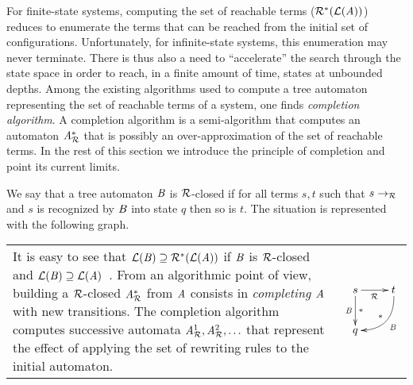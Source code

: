 


\noindent
For finite-state systems, computing the set of reachable terms
($\mathcal R^*(\mathcal{L}(\mathit A))$) reduces to enumerate the terms that can be
reached from the initial set of configurations. Unfortunately, for
infinite-state systems, this enumeration may never terminate.  There
is thus also a need to ``accelerate'' the search through the state
space in order to reach, in a finite amount of time, states at
unbounded depths. Among the existing algorithms used to compute a tree
automaton representing the set of reachable terms of a system, one
finds {\em completion algorithm}. A completion algorithm is a
semi-algorithm that computes an automaton ${\it A}_{\mathcal R}^*$ that is possibly
an over-approximation of the set of reachable terms. In the rest of
this section we introduce the principle of completion and point its
current limits.

We say that a tree automaton $\mathit B$ is $\mathcal R$-closed if for all terms
$s,t$ such that $s\rightarrow_\mathcal R$ and $s$ is recognized by $\mathit B$ into state $q$ then so is
$t$. The situation is represented with the following graph.
\begin{tabular}{lc}
  \hspace{-.3cm}
  \begin{minipage}{.8\linewidth}
    It is easy to see that $\mathcal{L}(\mathit B) \supseteq \mathcal R^*(\mathcal{L}(\mathit A))$ if
    $\mathit B$ is $\mathcal R$-closed and $\mathcal{L}(\mathit B)\supseteq
    \mathcal{L}(\mathit A)$~\cite{BoyerGJ-IJCAR08}. From an algorithmic point of
    view, building a $\mathcal R$-closed ${\it A}_{\mathcal R}^*$ from $\mathit A$ consists in {\em
      completing} $\mathit A$ with new transitions.  The completion algorithm
    computes successive automata ${\it A}_{\mathcal R}^1,{\it A}_{\mathcal R}^2,\ldots$ that
    represent the effect of applying the set of rewriting rules to the
    initial automaton.
  \end{minipage}
  &
  \begin{minipage}{.2\linewidth}
    $
    \xymatrix{
      s \ar[r]_{\R}\ar[d]^{*}_{\B} & t \ar@/^1.2pc/[ld]_{*}^{\B}\\
      q & %
    }
    $
  \end{minipage}
\end{tabular}

